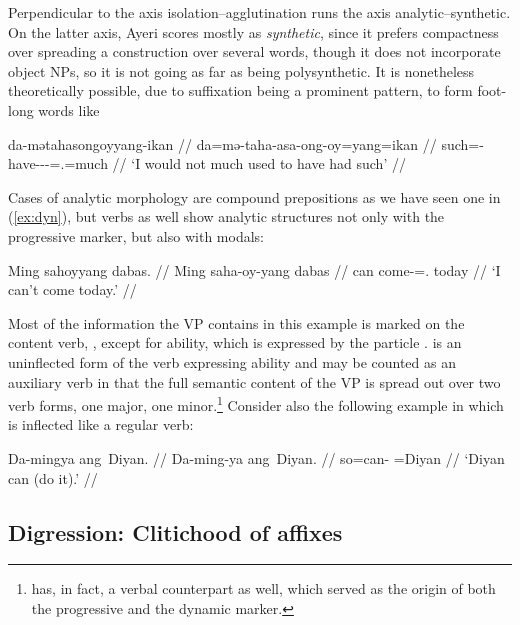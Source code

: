 Perpendicular to the axis isolation–agglutination runs the axis 
analytic–syn\-thetic. On the latter axis, Ayeri scores mostly as 
\emph{synthetic}, since it prefers compactness over spreading a construction 
over several words, though it does not incorporate object NPs, so it is not 
going as far as being poly\-syn\-thetic. It is nonetheless theoretically 
possible, due to suffixation being a prominent pattern, to form foot-long words 
like

\ex\begingl
	\gla da-mətahasongoyyang-ikan //
	\glb da=mə-taha-asa-ong-oy=yang=ikan //
	\glc such=\Pst{}-have-\Hab{}-\Irr{}-\Neg{}=\Fsg{}.\Aarg{}=much //
	\glft `I would not much used to have had such' //
\endgl\xe

Cases of analytic morphology are compound prepositions as we have seen 
one in 
(\ref{ex:dyn}), but verbs as well show analytic structures not only with the 
progressive marker, but also with modals:

\ex\begingl
	\gla Ming sahoyyang dabas. //
	\glb Ming saha-oy-yang dabas //
	\glc can come-\Neg{}=\Fsg{}.\Aarg{} today //
	\glft `I can't come today.' //
\endgl\xe

Most of the information the VP contains in this example is marked on the 
content verb, , except for ability, which is expressed 
by the particle .  is an uninflected form 
of the verb expressing ability and may be counted as an auxiliary verb in 
that the full semantic content of the VP is spread out over two verb forms, 
one major, one minor.\footnote{ has, in fact, a verbal 
counterpart  as well, which served as the origin 
of both the progressive and the dynamic marker.} Consider also the following 
example in which  is inflected like a regular verb:

\ex\begingl
	\gla Da-mingya ang~Diyan. //
	\glb Da-ming-ya ang~Diyan. //
	\glc so=can-\TsgM{} \Aarg{}=Diyan //
	\glft `Diyan can (do it).' //
\endgl\xe

\subsection*{Digression: Clitichood of affixes}

